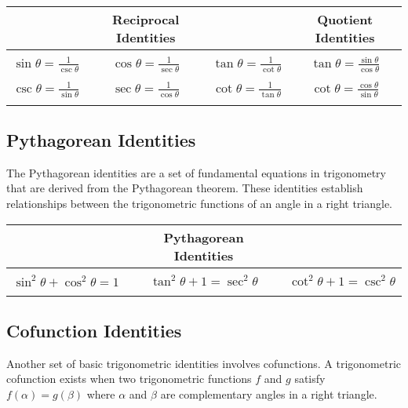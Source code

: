 \documentclass[11pt]{article}
\begin{document}
\begin{table}[H]
    \centering
    \begin{tabular}{|c c c|c|}
    \hline
         & Reciprocal Identities & & Quotient Identities \\
         \hline
         &&&\\
        $\displaystyle \sin\theta = \frac{1}{\csc\theta}$ &  $\displaystyle \cos\theta = \frac{1}{\sec\theta}$ & $\displaystyle \tan\theta = \frac{1}{\cot\theta}$ & $\displaystyle \tan\theta = \frac{\sin\theta}{\cos\theta}$ \\ &&&\\
        $\displaystyle \csc\theta = \frac{1}{\sin\theta}$ &  $\displaystyle \sec\theta = \frac{1}{\cos\theta}$ & $\displaystyle \cot\theta = \frac{1}{\tan\theta}$ & $\displaystyle \cot\theta = \frac{\cos\theta}{\sin\theta}$ \\
        &&&\\
    \hline
    \end{tabular}
\end{table}

\subsection{Pythagorean Identities}
The Pythagorean identities are a set of fundamental equations in trigonometry that are derived from the Pythagorean theorem. These identities establish relationships between the trigonometric functions of an angle in a right triangle.

\begin{table}[H]
    \centering
    \begin{tabular}{|c c c|}
    \hline
    & Pythagorean Identities & \\
    \hline
    &&\\
        $\displaystyle \sin^2\theta + \cos^2\theta = 1$\hspace{1cm} &  $\displaystyle \tan^2\theta + 1 = \sec^2\theta$\hspace{1cm} & $\displaystyle \cot^2\theta + 1 = \csc^2\theta$ \\
    &&\\
    \hline
    \end{tabular}
\end{table}

\subsection{Cofunction Identities}
Another set of basic trigonometric identities involves cofunctions. A trigonometric cofunction exists when two trigonometric functions $f$ and $g$ satisfy $f(\alpha) = g(\beta)$ where $\alpha$ and $\beta$ are complementary angles in a right triangle.
\end{document}
